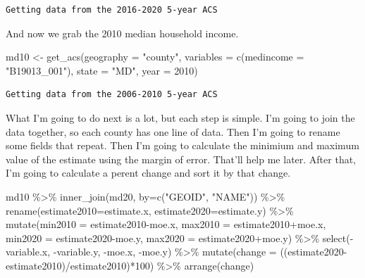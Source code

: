 \documentclass[
  letterpaper,
  DIV=11,
  numbers=noendperiod]{scrreprt}
\newenvironment{Shaded}{\begin{snugshade}}{\end{snugshade}}
\newcommand{\AttributeTok}[1]{\textcolor[rgb]{0.40,0.45,0.13}{#1}}
\newcommand{\DecValTok}[1]{\textcolor[rgb]{0.68,0.00,0.00}{#1}}
\newcommand{\FunctionTok}[1]{\textcolor[rgb]{0.28,0.35,0.67}{#1}}
\newcommand{\NormalTok}[1]{\textcolor[rgb]{0.00,0.23,0.31}{#1}}
\newcommand{\OtherTok}[1]{\textcolor[rgb]{0.00,0.23,0.31}{#1}}
\newcommand{\SpecialCharTok}[1]{\textcolor[rgb]{0.37,0.37,0.37}{#1}}
\newcommand{\StringTok}[1]{\textcolor[rgb]{0.13,0.47,0.30}{#1}}
\begin{document}
\begin{verbatim}
Getting data from the 2016-2020 5-year ACS
\end{verbatim}

And now we grab the 2010 median household income.

\begin{Shaded}
\begin{Highlighting}[]
\NormalTok{md10 }\OtherTok{\textless{}{-}} \FunctionTok{get\_acs}\NormalTok{(}\AttributeTok{geography =} \StringTok{"county"}\NormalTok{,}
              \AttributeTok{variables =} \FunctionTok{c}\NormalTok{(}\AttributeTok{medincome =} \StringTok{"B19013\_001"}\NormalTok{),}
              \AttributeTok{state =} \StringTok{"MD"}\NormalTok{,}
              \AttributeTok{year =} \DecValTok{2010}\NormalTok{)}
\end{Highlighting}
\end{Shaded}

\begin{verbatim}
Getting data from the 2006-2010 5-year ACS
\end{verbatim}

What I'm going to do next is a lot, but each step is simple. I'm going
to join the data together, so each county has one line of data. Then I'm
going to rename some fields that repeat. Then I'm going to calculate the
minimium and maximum value of the estimate using the margin of error.
That'll help me later. After that, I'm going to calculate a perent
change and sort it by that change.

\begin{Shaded}
\begin{Highlighting}[]
\NormalTok{md10 }\SpecialCharTok{\%\textgreater{}\%}
  \FunctionTok{inner\_join}\NormalTok{(md20, }\AttributeTok{by=}\FunctionTok{c}\NormalTok{(}\StringTok{"GEOID"}\NormalTok{, }\StringTok{"NAME"}\NormalTok{)) }\SpecialCharTok{\%\textgreater{}\%}
  \FunctionTok{rename}\NormalTok{(}\AttributeTok{estimate2010=}\NormalTok{estimate.x, }\AttributeTok{estimate2020=}\NormalTok{estimate.y) }\SpecialCharTok{\%\textgreater{}\%}
  \FunctionTok{mutate}\NormalTok{(}\AttributeTok{min2010 =}\NormalTok{ estimate2010}\SpecialCharTok{{-}}\NormalTok{moe.x, }\AttributeTok{max2010 =}\NormalTok{ estimate2010}\SpecialCharTok{+}\NormalTok{moe.x, }\AttributeTok{min2020 =}\NormalTok{ estimate2020}\SpecialCharTok{{-}}\NormalTok{moe.y, }\AttributeTok{max2020 =}\NormalTok{ estimate2020}\SpecialCharTok{+}\NormalTok{moe.y) }\SpecialCharTok{\%\textgreater{}\%}
  \FunctionTok{select}\NormalTok{(}\SpecialCharTok{{-}}\NormalTok{variable.x, }\SpecialCharTok{{-}}\NormalTok{variable.y, }\SpecialCharTok{{-}}\NormalTok{moe.x, }\SpecialCharTok{{-}}\NormalTok{moe.y) }\SpecialCharTok{\%\textgreater{}\%}
  \FunctionTok{mutate}\NormalTok{(}\AttributeTok{change =}\NormalTok{ ((estimate2020}\SpecialCharTok{{-}}\NormalTok{estimate2010)}\SpecialCharTok{/}\NormalTok{estimate2010)}\SpecialCharTok{*}\DecValTok{100}\NormalTok{) }\SpecialCharTok{\%\textgreater{}\%}
  \FunctionTok{arrange}\NormalTok{(change)}
\end{Highlighting}
\end{Shaded}
\end{document}
